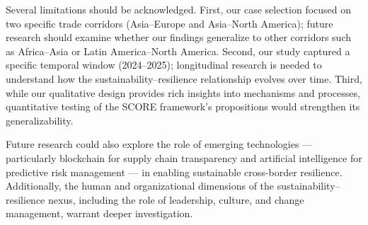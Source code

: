 \documentclass[12pt,a4paper,twoside]{article}
\begin{document}
Several limitations should be acknowledged.  First, our case selection focused
on two specific trade corridors (Asia--Europe and Asia--North America); future
research should examine whether our findings generalize to other corridors such
as Africa--Asia or Latin America--North America.  Second, our study captured a
specific temporal window (2024--2025); longitudinal research is needed to
understand how the sustainability--resilience relationship evolves over time.
Third, while our qualitative design provides rich insights into mechanisms and
processes, quantitative testing of the SCORE framework's propositions would
strengthen its generalizability.

Future research could also explore the role of emerging technologies ---
particularly blockchain for supply chain transparency and artificial
intelligence for predictive risk management --- in enabling sustainable
cross-border resilience.  Additionally, the human and organizational dimensions
of the sustainability--resilience nexus, including the role of leadership,
culture, and change management, warrant deeper investigation.


\end{document}
